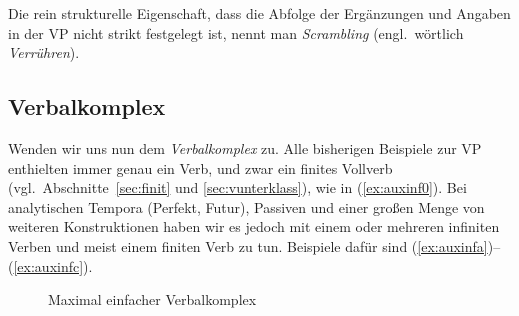 \begin{exe}
  \ex\label{ex:vgrorder}
  \begin{xlist}
    \ex{\ThePhrasenExOne}
    \ex{\ThePhrasenExTwo}
  \end{xlist}
\end{exe}

Die rein strukturelle Eigenschaft, dass die Abfolge der Ergänzungen und Angaben in der VP nicht strikt festgelegt ist, nennt man \textit{Scrambling} (engl.\ wörtlich \textit{Verrühren}).


\subsection{Verbalkomplex}

\label{sec:verbkomplexe}


Wenden wir uns nun dem \textit{Verbalkomplex} zu.
Alle bisherigen Beispiele zur VP enthielten immer genau ein Verb, und zwar ein finites Vollverb (vgl.\ Abschnitte~\ref{sec:finit} und \ref{sec:vunterklass}), wie in (\ref{ex:auxinf0}).
Bei analytischen Tempora (Perfekt, Futur), Passiven und einer großen Menge von weiteren Konstruktionen haben wir es jedoch mit einem oder mehreren infiniten Verben und meist einem finiten Verb zu tun.
Beispiele dafür sind (\ref{ex:auxinfa})--(\ref{ex:auxinfc}).

\begin{exe}
  \ex\label{ex:auxinf}
  \begin{xlist}
  \end{xlist}
\end{exe}

\begin{figure}
  \centering
  \caption{Maximal einfacher Verbalkomplex}
  \label{fig:vkomplex0}
\end{figure}

